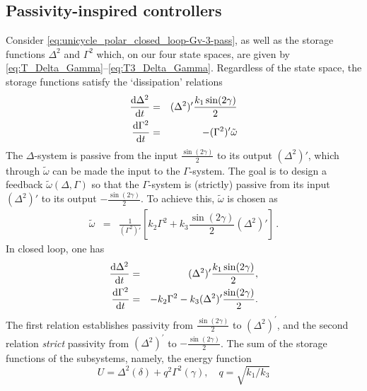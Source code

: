 \documentclass[journal,twoside,web]{ieeecolor}
\theoremstyle{definition}
\begin{document}
\subsection{Passivity-inspired controllers}
Consider \eqref{eq:unicycle_polar_closed_loop-Gv-3-pass}, as well as the storage functions $\Delta^2$ and $\Gamma^2$ which, on our four state spaces, are
given by \eqref{eq:T_Delta_Gamma}--\eqref{eq:T3_Delta_Gamma}.
Regardless of the state space, the storage functions satisfy the `dissipation' relations 
\begin{eqnarray}
  \frac{{\rm d} \Delta^2}{ {\rm d} t} &=&   (\Delta^2)^{\prime} \frac{k_1\sin(2\gamma)}{2}  \\
  \frac{{\rm d} \Gamma^2}{ {\rm d} t} &=&  -(\Gamma^2)^{\prime}  \tilde{\omega}
\end{eqnarray}
The $\Delta$-system is passive from the input $\frac{\sin(2\gamma)}{2}$ to its output $(\Delta^2)'
$, which through $\tilde{\omega}$ can be made the input to the $\Gamma$-system. 
The goal is to design a feedback $\tilde\omega(\Delta,\Gamma)$ so that the $\Gamma$-system is (strictly) passive from its input $(\Delta^2)
'$ to its output $-\frac{\sin(2\gamma)}{2}$. 
To achieve this, $\tilde\omega$ is chosen as
\begin{eqnarray}
    \tilde{\omega} &=& \frac{1}{(\Gamma^2)'}
\left[ k_2 \Gamma^2 + k_3 \dfrac{\sin(2\gamma)}{2}(\Delta^2)'\right]\,. 
\label{eq:passivity_general_control}
\end{eqnarray}
In closed loop, one has
\begin{eqnarray}
  \frac{{\rm d} \Delta^2}{ {\rm d} t} &=&   (\Delta^2)^{\prime} \frac{k_1 \sin(2\gamma)}{2}, \label{eq:Delta_squared} \\
  \frac{{\rm d} \Gamma^2}{ {\rm d} t} &=&  -k_2\Gamma^2 - k_3(\Delta^2)'\dfrac{\sin(2\gamma)}{2}.\label{eq:Gamma_squared}
\end{eqnarray}
The first relation establishes passivity from $\frac{\sin(2\gamma)}{2}$ to $(\Delta^2)^{\prime} $, and the second relation {\em strict} passivity from $(\Delta^2)^{\prime} $ to $-\frac{\sin(2\gamma)}{2}$.
The sum of the storage functions of the subsystems, namely, the energy function
\begin{equation}
    U = \Delta^2(\delta) + q^2\Gamma^2(\gamma), \quad q = \sqrt{k_1/k_3} \label{eq:U_common_passivity}
\end{equation}
\end{document}
